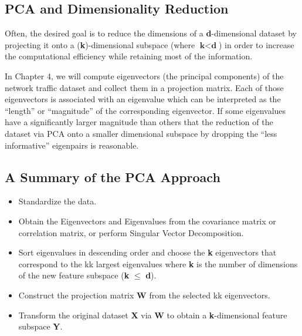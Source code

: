 \documentclass[a4paper]{article}
\begin{document}

\subsection{PCA and Dimensionality Reduction}
Often, the desired goal is to reduce the dimensions of a \textbf{d}-dimensional dataset by projecting it onto a (\textbf{k})-dimensional subspace (where $\textbf{k} < \textbf{d}$) in order to increase the computational efficiency while retaining most of the information.

In Chapter 4, we will compute eigenvectors (the principal components) of the network traffic dataset and collect them in a projection matrix. Each of those eigenvectors is associated with an eigenvalue which can be interpreted as the “length” or “magnitude” of the corresponding eigenvector. If some eigenvalues have a significantly larger magnitude than others that the reduction of the dataset via PCA onto a smaller dimensional subspace by dropping the “less informative” eigenpairs is reasonable.


\subsection{A Summary of the PCA Approach}
\begin{itemize}
	\item Standardize the data.
	\item Obtain the Eigenvectors and Eigenvalues from the covariance matrix or correlation matrix, or perform Singular Vector Decomposition.
	\item Sort eigenvalues in descending order and choose the \textbf{k} eigenvectors that correspond to the kk largest eigenvalues where \textbf{k} is the number of dimensions of the new feature subspace (\textbf{k} $\leqslant$ \textbf{d}).
	\item Construct the projection matrix \textbf{W} from the selected kk eigenvectors.
	\item Transform the original dataset \textbf{X} via \textbf{W} to obtain a \textbf{k}-dimensional feature subspace \textbf{Y}.
\end{itemize}


%
%
\end{document}
